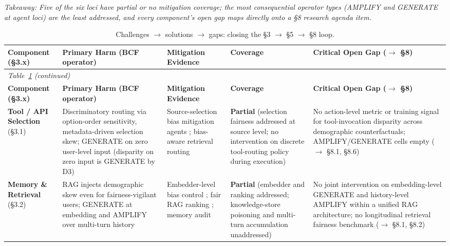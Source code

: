 \documentclass[acmsmall,nonacm]{acmart}
\begin{document}
\emph{Takeaway: Five of the six loci have partial or no mitigation coverage; the most consequential operator types (AMPLIFY and GENERATE at agent loci) are the least addressed, and every component's open gap maps directly onto a \S{}8 research agenda item.}

\begingroup
\footnotesize
\setlength{\tabcolsep}{4pt}
\begin{longtable}{|p{}|p{}|p{}|p{}|p{}|}
\caption{Challenges $\rightarrow$ solutions $\rightarrow$ gaps: closing the \S{}3 $\rightarrow$ \S{}5 $\rightarrow$ \S{}8 loop.}
\label{tab:challenges-gaps}\\
\toprule
\textbf{Component (\S{}3.x)} & \textbf{Primary Harm (BCF operator)} & \textbf{Mitigation Evidence} & \textbf{Coverage} & \textbf{Critical Open Gap ($\rightarrow$ \S{}8)} \\
\midrule
\endfirsthead
\multicolumn{5}{l}{\emph{Table~\ref{tab:challenges-gaps} (continued)}}\\
\toprule
\textbf{Component (\S{}3.x)} & \textbf{Primary Harm (BCF operator)} & \textbf{Mitigation Evidence} & \textbf{Coverage} & \textbf{Critical Open Gap ($\rightarrow$ \S{}8)} \\
\midrule
\endhead
\bottomrule
\endfoot
\textbf{Tool / API Selection} (\S{}3.1) & Discriminatory routing via option-order sensitivity, metadata-driven selection skew; GENERATE on zero user-level input (disparity on zero input is GENERATE by D3) \cite{blankenstein2025biasbusters,sneh2025tooltweak} & Source-selection bias mitigation agents \cite{singh2025bias,singh2025biasb}; bias-aware retrieval routing & \textbf{Partial} (selection fairness addressed at source level; no intervention on discrete tool-routing policy during execution) & No action-level metric or training signal for tool-invocation disparity across demographic counterfactuals; AMPLIFY/GENERATE cells empty ($\rightarrow$ \S{}8.1, \S{}8.6) \\
\textbf{Memory \& Retrieval} (\S{}3.2) & RAG injects demographic skew even for fairness-vigilant users; GENERATE at embedding and AMPLIFY over multi-turn history \cite{hu2024free,fan2024fairmt,wang2025bias} & Embedder-level bias control \cite{kim2025mitigating}; fair RAG ranking \cite{kim2024fair}; memory audit \cite{ma2026implicit} & \textbf{Partial} (embedder and ranking addressed; knowledge-store poisoning and multi-turn accumulation unaddressed) & No joint intervention on embedding-level GENERATE and history-level AMPLIFY within a unified RAG architecture; no longitudinal retrieval fairness benchmark ($\rightarrow$ \S{}8.1, \S{}8.2) \\

\end{longtable}
\end{document}
